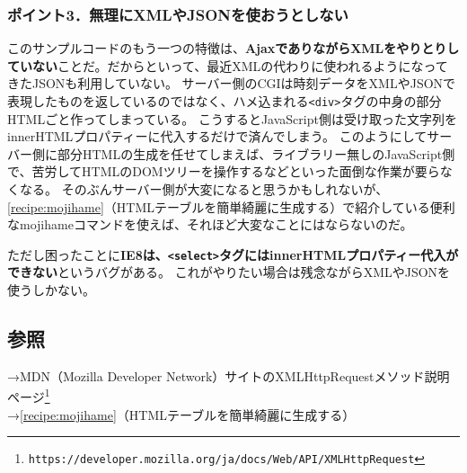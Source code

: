 \subsubsection*{ポイント3．無理にXMLやJSONを使おうとしない}

このサンプルコードのもう一つの特徴は、\textbf{AjaxでありながらXMLをやりとりしていない}ことだ。だからといって、最近XMLの代わりに使われるようになってきたJSONも利用していない。
サーバー側のCGIは時刻データをXMLやJSONで表現したものを返しているのではなく、ハメ込まれる\verb|<div>|タグの中身の部分HTMLごと作ってしまっている。
こうするとJavaScript側は受け取った文字列をinnerHTMLプロパティーに代入するだけで済んでしまう。
このようにしてサーバー側に部分HTMLの生成を任せてしまえば、ライブラリー無しのJavaScript側で、苦労してHTMLのDOMツリーを操作するなどといった面倒な作業が要らなくなる。
そのぶんサーバー側が大変になると思うかもしれないが、\ref{recipe:mojihame}（HTMLテーブルを簡単綺麗に生成する）で紹介している便利なmojihameコマンドを使えば、それほど大変なことにはならないのだ。

ただし困ったことに\textbf{IE8は、\verb|<select>|タグにはinnerHTMLプロパティー代入ができない}というバグがある。
これがやりたい場合は残念ながらXMLやJSONを使うしかない。

\subsection*{参照}

\noindent
→MDN（Mozilla Developer Network）サイトのXMLHttpRequestメソッド説明ページ\footnote{\verb|https://developer.mozilla.org/ja/docs/Web/API/XMLHttpRequest|} \\
→\ref{recipe:mojihame}（HTMLテーブルを簡単綺麗に生成する）
